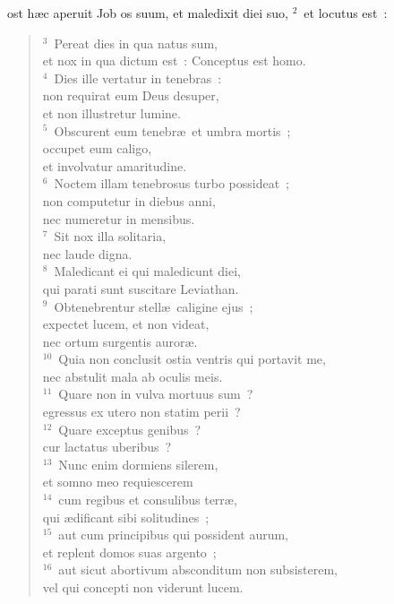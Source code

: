 \bchapter
{}ost h\ae c aperuit Job os suum, et maledixit diei suo,
${}^{2}$~et locutus est~:
\begin{flushleft}\begin{verse}${}^{3}$~Pereat dies in qua natus sum,\\ et nox in qua dictum est~: Conceptus est homo.\\
${}^{4}$~Dies ille vertatur in tenebras~:\\ non requirat eum Deus desuper,\\ et non illustretur lumine.\\
${}^{5}$~Obscurent eum tenebr\ae\ et umbra mortis~;\\ occupet eum caligo,\\ et involvatur amaritudine.\\
${}^{6}$~Noctem illam tenebrosus turbo possideat~;\\ non computetur in diebus anni,\\ nec numeretur in mensibus.\\
${}^{7}$~Sit nox illa solitaria,\\ nec laude digna.\\
${}^{8}$~Maledicant ei qui maledicunt diei,\\ qui parati sunt suscitare Leviathan.\\
${}^{9}$~Obtenebrentur stell\ae\ caligine ejus~;\\ expectet lucem, et non videat,\\ nec ortum surgentis auror\ae .\\
${}^{10}$~Quia non conclusit ostia ventris qui portavit me,\\ nec abstulit mala ab oculis meis.\\
${}^{11}$~Quare non in vulva mortuus sum~?\\ egressus ex utero non statim perii~?\\
${}^{12}$~Quare exceptus genibus~?\\ cur lactatus uberibus~?\\
${}^{13}$~Nunc enim dormiens silerem,\\ et somno meo requiescerem\\
${}^{14}$~cum regibus et consulibus terr\ae ,\\ qui \ae dificant sibi solitudines~;\\
${}^{15}$~aut cum principibus qui possident aurum,\\ et replent domos suas argento~;\\
${}^{16}$~aut sicut abortivum absconditum non subsisterem,\\ vel qui concepti non viderunt lucem.\\

\end{verse}
\end{flushleft}

